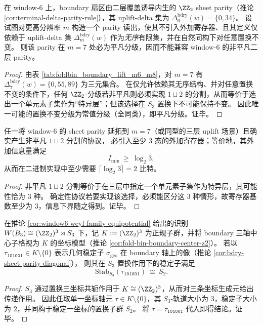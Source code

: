\begin{proposition}\label{prop:bdry-sheet-parity-extension-obstruction-m7}
在 window-\(6\) 上，boundary 扇区由二层覆盖诱导内生的 \(\ZZ_2\) sheet parity（推论 \ref{cor:terminal-delta-parity-rule}），其 uplift-delta 集为 \(\Delta^{\mathrm{bdry}}_6(w)=\{0,34\}\)。
设试图对更高分辨率 \(m\) 构造一个 parity 读出，使其不引入外加寄存器、且其定义仅依赖于 uplift-delta 集 \(\Delta^{\mathrm{bdry}}_m(w)\) 作为\emph{无序}有限集，并在自然同构下对任意置换不变。
则该 parity 在 \(m=7\) 处必为平凡分级，因而不能兼容 window-\(6\) 的非平凡二层 parity。
\end{proposition}
\begin{proof}
由表 \ref{tab:foldbin_boundary_lift_m6_m8}，对 \(m=7\) 有 \(\Delta^{\mathrm{bdry}}_7(w)=\{0,55,89\}\) 为三元集合。
在仅允许依赖其无序结构、并对任意置换不变的条件下，任何 \(\ZZ_2\)-分级若非平凡则必须实现 \(1\sqcup 2\) 的分割，从而等价于选出一个单元素子集作为“特异层”；但该选择在 \(S_3\) 置换下不可能保持不变。
因此唯一可能的置换不变分级为常值分级（全同类），即平凡分级。证毕。
\end{proof}

\begin{corollary}\label{cor:bdry-sheet-parity-extension-min-register}
任一将 window-\(6\) 的 sheet parity 延拓到 \(m=7\)（或同型的三层 uplift 场景）且确实产生非平凡 \(1\sqcup 2\) 分割的协议，
必引入至少 \(3\) 态的外加寄存器；等价地，其外加信息量满足
\[
I_{\min}\ \ge\ \log_2 3,
\]
从而在二进制实现中至少需要 \(\lceil \log_2 3\rceil=2\) 比特。
\end{corollary}
\begin{proof}
非平凡 \(1\sqcup 2\) 分割等价于在三层中指定一个单元素子集作为特异层，其可能性恰为 \(3\) 种。
确定性协议若要实现该选择，必须能区分这 \(3\) 种情形，故寄存器基数至少为 \(3\)，信息下界随之得到。证毕。
\end{proof}





\begin{proposition}\label{prop:bdry-s3-to-s2-breaking-by-geo-axis}
在推论 \ref{cor:window6-weyl-family-equipotential} 给出的识别
\(
W(B_3)\cong (\ZZ_2)^3\rtimes S_3
\)
下，记 \(K:=(\ZZ_2)^3\) 为正规子群，并将 boundary 三轴中心子格视为 \(K\) 的坐标模型（推论 \ref{cor:fold-bin-boundary-center-z2}）。
若以 \(\tau_{\texttt{101001}}\in K\setminus\{0\}\) 表示几何稳定子 \(\sigma_{\mathrm{geo}}\) 在 boundary 轴上的像（推论 \ref{cor:bdry-sheet-parity-diagonal}），
则其在 \(S_3\) 置换作用下的稳定子满足
\[
\mathrm{Stab}_{S_3}(\tau_{\texttt{101001}})\ \cong\ S_2.
\]
\end{proposition}
\begin{proof}
\(S_3\) 通过置换三坐标共轭作用于 \(K\cong(\ZZ_2)^3\)，从而对三条坐标生成元给出传递作用。
因此任取单一坐标轴元 \(\tau\in K\setminus\{0\}\)，其 \(S_3\)-轨道大小为 \(3\)，稳定子大小为 \(2\)，并同构于稳定一坐标的置换子群 \(S_2\)。
将 \(\tau=\tau_{\texttt{101001}}\) 代入即得结论。证毕。
\end{proof}

